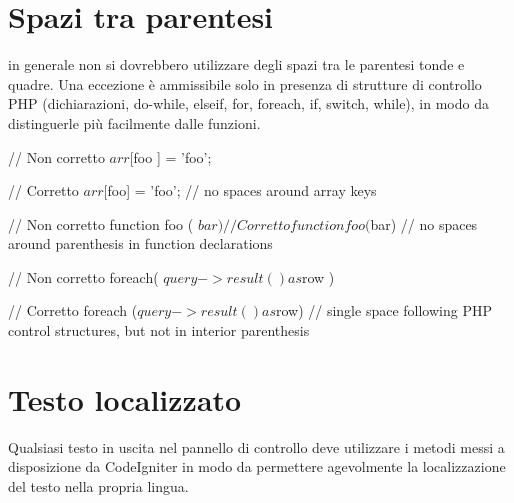 
\section{Spazi tra parentesi}
in generale non si dovrebbero utilizzare degli spazi tra le parentesi tonde e quadre. Una eccezione è ammissibile solo in presenza di strutture di controllo \ac{PHP} (dichiarazioni, do-while, elseif, for, foreach, if, switch, while), in modo da distinguerle più facilmente dalle funzioni.

\begin{code}
// Non corretto
$arr[ $foo ] = 'foo';

// Corretto
$arr[$foo] = 'foo'; // no spaces around array keys


// Non corretto
function foo ( $bar )
{

}

// Corretto
function foo($bar) // no spaces around parenthesis in function declarations
{

}


// Non corretto
foreach( $query->result() as $row )

// Corretto
foreach ($query->result() as $row) // single space following PHP control structures, but not in interior parenthesis
\end{code}

\section{Testo localizzato}
Qualsiasi testo in uscita nel pannello di controllo deve utilizzare i metodi messi a disposizione da CodeIgniter in modo da permettere agevolmente la localizzazione del testo nella propria lingua.

